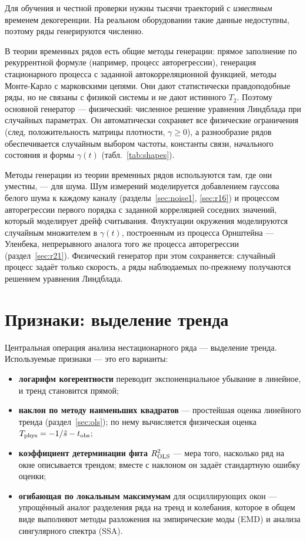 \documentclass[12pt,a4paper]{report}
\numberwithin{equation}{chapter}
\begin{document}
Для обучения и честной проверки нужны тысячи траекторий с \emph{известным}
временем декогеренции. На реальном оборудовании такие данные недоступны,
поэтому ряды генерируются численно.

В теории временных рядов есть общие методы генерации: прямое заполнение
по рекуррентной формуле (например, процесс авторегрессии), генерация
стационарного процесса с заданной автокорреляционной функцией, методы
Монте-Карло с марковскими цепями. Они дают статистически правдоподобные
ряды, но не связаны с физикой системы и не дают истинного $T_2$.
Поэтому основной генератор --- физический: численное решение уравнения
Линдблада при случайных параметрах. Он автоматически сохраняет все
физические ограничения (след, положительность матрицы плотности,
$\gamma\ge0$), а разнообразие рядов обеспечивается случайным выбором
частоты, константы связи, начального состояния и формы $\gamma(t)$
(табл.~\ref{tab:shapes}).

Методы генерации из теории временных рядов используются там, где они
уместны, --- для шума. Шум измерений моделируется добавлением гауссова
белого шума к каждому каналу (разделы~\ref{sec:noise1}, \ref{sec:r16}) и
процессом авторегрессии первого порядка с заданной корреляцией соседних
значений, который моделирует дрейф считывания. Флуктуации окружения
моделируются случайным множителем в $\gamma(t)$, построенным из процесса
Орнштейна --- Уленбека, непрерывного аналога того же процесса
авторегрессии (раздел~\ref{sec:r21}). Физический генератор при этом
сохраняется: случайный процесс задаёт только скорость, а ряды
наблюдаемых по-прежнему получаются решением уравнения Линдблада.

\section{Признаки: выделение тренда}

Центральная операция анализа нестационарного ряда --- выделение тренда.
Используемые признаки --- это его варианты:
\begin{itemize}
\item \textbf{логарифм когерентности} переводит экспоненциальное убывание в
      линейное, и тренд становится прямой;
\item \textbf{наклон по методу наименьших квадратов} --- простейшая оценка
      линейного тренда (раздел~\ref{sec:ols}); по нему вычисляется
      физическая оценка $T_{\rm phys}=-1/\hat s-t_{\rm obs}$;
\item \textbf{коэффициент детерминации фита} $R^2_{\rm OLS}$ --- мера того,
      насколько ряд на окне описывается трендом; вместе с наклоном он
      задаёт стандартную ошибку оценки;
\item \textbf{огибающая по локальным максимумам} для осциллирующих окон ---
      упрощённый аналог разделения ряда на тренд и колебания, которое в
      общем виде выполняют методы разложения на эмпирические моды (EMD) и
      анализа сингулярного спектра (SSA).
\end{itemize}
\end{document}
